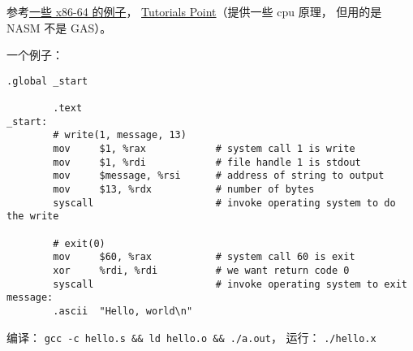 
\begin{issues}
\issueDraft
\end{issues}

参考\href{https://cs.lmu.edu/~ray/notes/gasexamples/}{一些 x86-64 的例子}， \href{https://www.tutorialspoint.com/assembly_programming/index.htm}{Tutorials Point}（提供一些 cpu 原理， 但用的是 NASM 不是 GAS）。

一个例子：
\begin{lstlisting}[language=none]
        .global _start

        .text
_start:
        # write(1, message, 13)
        mov     $1, %rax            # system call 1 is write
        mov     $1, %rdi            # file handle 1 is stdout
        mov     $message, %rsi      # address of string to output
        mov     $13, %rdx           # number of bytes
        syscall                     # invoke operating system to do the write

        # exit(0)
        mov     $60, %rax           # system call 60 is exit
        xor     %rdi, %rdi          # we want return code 0
        syscall                     # invoke operating system to exit
message:
        .ascii  "Hello, world\n"
\end{lstlisting}

编译： \verb|gcc -c hello.s && ld hello.o && ./a.out|， 运行： \verb|./hello.x|

